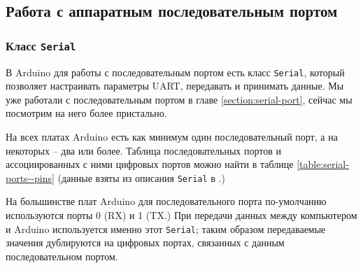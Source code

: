 \documentclass[../sparc.tex]{subfiles}
\begin{document}

\subsection{Работа с аппаратным последовательным портом}

\subsubsection{Класс \texttt{Serial}}

В Arduino для работы с последовательным портом есть класс \texttt{Serial},
который позволяет настраивать параметры UART, передавать и принимать данные.  Мы
уже работали с последовательным портом в главе \ref{section:serial-port}, сейчас
мы посмотрим на него более пристально.

На всех платах Arduino есть как минимум один последовательный порт, а на
некоторых -- два или более.  Таблица последовательных портов и ассоциированных с
ними цифровых портов можно найти в таблице \ref{table:serial-ports--pins} (данные
взяты из описания \texttt{Serial} в \cite{arduino:reference}.)


На большинстве плат Arduino для последовательного порта по-умолчанию
используются порты 0 (RX) и 1 (TX.)  При передачи данных между компьютером и
Arduino используется именно этот \texttt{Serial}; таким образом передаваемые
значения дублируются на цифровых портах, связанных с данным последовательном
портом.
\end{document}
